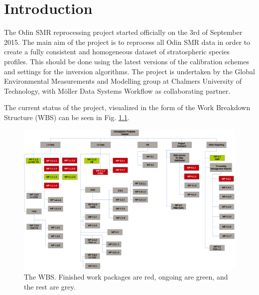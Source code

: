 \chapter{Introduction}
\label{chapter:introduction}

\setcounter{page}{1}


The Odin SMR reprocessing project started officially on the 3rd of September 2015. The main aim of the project is to reprocess all Odin SMR data in order to create a fully consistent and homogeneous dataset of stratospheric species profiles. This should be done using the latest versions of the calibration schemes and settings for the inversion algorithms. The project is undertaken by the Global Environmental Measurements and Modelling group at Chalmers University of Technology, with M\"oller Data Systems Workflow as collaborating partner.   

The current status of the project, visualized in the form of the Work Breakdown Structure (WBS) can be seen in Fig. \ref{fig:WBS}.

\begin{figure}[t]
\centering
\includegraphics[scale = 0.5]{figures/wbsTMMR1.eps}
\caption{The WBS. Finished work packages are red, ongoing are green, and the rest are grey.}
\label{fig:WBS}
\end{figure}

